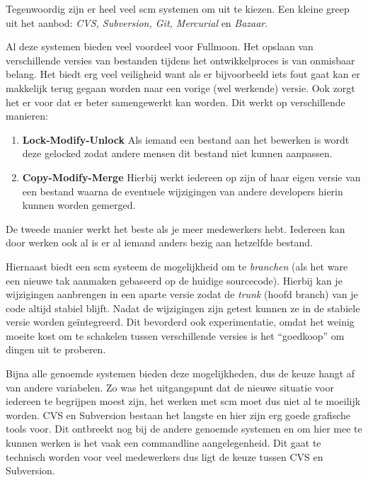 \documentclass[12pt,a4paper]{article}
\begin{document}
    Tegenwoordig zijn er heel veel {\sc scm} systemen om uit te kiezen. Een kleine greep uit het aanbod: \emph{CVS, Subversion, Git, Mercurial} en \emph{Bazaar}.
    
    Al deze systemen bieden veel voordeel voor Fullmoon. Het opslaan van verschillende versies van bestanden tijdens het ontwikkelproces is van onmisbaar belang. Het biedt erg veel veiligheid want als er bijvoorbeeld iets fout gaat kan er makkelijk terug gegaan worden naar een vorige (wel werkende) versie. Ook zorgt het er voor dat er beter samengewerkt kan worden. Dit werkt op verschillende manieren:
    
    \begin{enumerate}
      \item \textbf{Lock-Modify-Unlock} Als iemand een bestand aan het bewerken is wordt deze gelocked zodat andere mensen dit bestand niet kunnen aanpassen.
      \item \textbf{Copy-Modify-Merge} Hierbij werkt iedereen op zijn of haar eigen versie van een bestand waarna de eventuele wijzigingen van andere developers hierin kunnen worden gemerged. 
    \end{enumerate}
    
    De tweede manier werkt het beste als je meer medewerkers hebt. Iedereen kan door werken ook al is er al iemand anders bezig aan hetzelfde bestand.
    
    Hiernaast biedt een {\sc scm} systeem de mogelijkheid om te \emph{branchen} (als het ware een nieuwe tak aanmaken gebaseerd op de huidige sourcecode). Hierbij kan je wijzigingen aanbrengen in een aparte versie zodat de \emph{trunk} (hoofd branch) van je code altijd stabiel blijft. Nadat de wijzigingen zijn getest kunnen ze in de stabiele versie worden ge\"{i}ntegreerd. Dit bevorderd ook experimentatie, omdat het weinig moeite kost om te schakelen tussen verschillende versies is het ``goedkoop'' om dingen uit te proberen.
    
    Bijna alle genoemde systemen bieden deze mogelijkheden, dus de keuze hangt af van andere variabelen. Zo was het uitgangspunt dat de nieuwe situatie voor iedereen te begrijpen moest zijn, het werken met {\sc scm} moet dus niet al te moeilijk worden. CVS en Subversion bestaan het langste en hier zijn erg goede grafische tools voor. Dit ontbreekt nog bij de andere genoemde systemen en om hier mee te kunnen werken is het vaak een commandline aangelegenheid. Dit gaat te technisch worden voor veel medewerkers dus ligt de keuze tussen CVS en Subversion.
    
\end{document}
